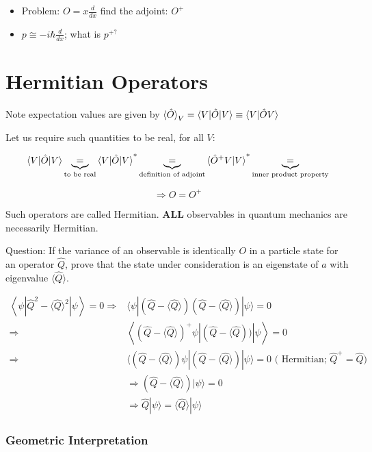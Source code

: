 \documentclass{article}
\begin{document}
\begin{itemize}
    \item Problem: $O=x \frac{d}{d x}$ find the adjoint: $O^+$
    \item $p \cong-i \hbar \frac{d}{d x}$; what is $p^{+?}$
\end{itemize}

\section{Hermitian Operators}

Note expectation values are given by $\braket{\hat{O}}_V = \braket{V|\hat{O}|V} \equiv \braket{V|\hat{O} V}$

Let us require such quantities to be real, for all $V$:

$$\braket{V|\hat{O}|V} \underbrace{=}_{\text{to be real}} \braket{V|\hat{O}|V}^* \underbrace{=}_{\text{definition of adjoint}} \braket{\hat{O}^+ V | V}^* \underbrace{=}_{\text{inner product property}}$$

$$\Rightarrow O = O^+$$

Such operators are called Hermitian. \textbf{ALL}
 observables in quantum mechanics are necessarily Hermitian. 
 
Question: If the variance of an observable is identically $O$ in a particle state for an operator $\hat{Q}$, prove that the state under consideration is an eigenstate of $\hat{a}$ with eigenvalue $\langle\hat{Q}\rangle$.

$$
\begin{aligned}
\left\langle\psi\left|\hat{Q}^{2}-\langle\hat{Q}\rangle^{2}\right| \psi\right\rangle=0 \Rightarrow &\langle\psi|(\hat{Q}-\langle\hat{Q}\rangle)(\hat{Q}-\langle\hat{Q}\rangle)| \psi\rangle=0 \\
\Rightarrow &\left\langle(\hat{Q}-\langle\hat{Q}\rangle)^{+} \psi|(\hat{Q}-\langle\hat{Q}))| \psi\right\rangle=0 \\
\Rightarrow &\langle(\hat{Q}-\langle\hat{Q}\rangle) \psi|(\hat{Q}-\langle\hat{Q}\rangle)| \psi\rangle=0 \text { ( Hermitian;  } \hat{Q}^+ = \hat{Q} ) \\
& \Rightarrow(\hat{Q}-\langle\hat{Q}\rangle)|\psi\rangle=0 \\
& \Rightarrow \hat{Q}|\psi\rangle=\langle\hat{Q}\rangle|\psi\rangle
\end{aligned}
$$

\subsubsection*{Geometric Interpretation}
\end{document}

